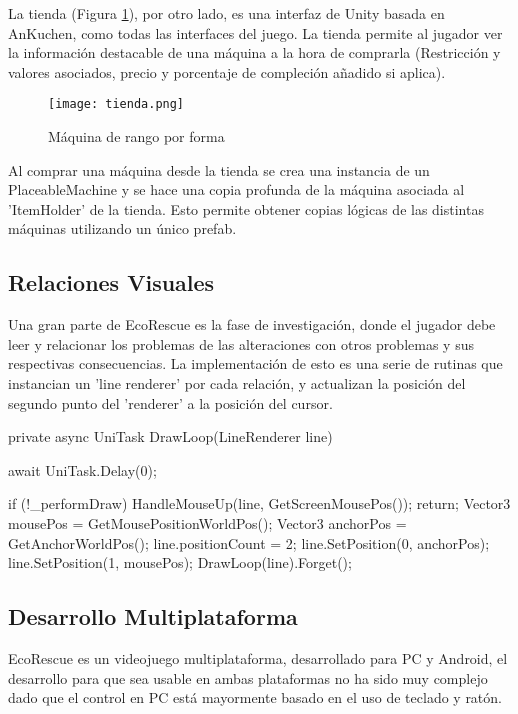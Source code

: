 La tienda (Figura \ref{fig:tienda}), por otro lado, es una interfaz de Unity basada en AnKuchen\cite{AnKuchen}, como todas las interfaces del juego. La tienda permite al jugador ver la información destacable de una máquina a la hora de comprarla (Restricción y valores asociados, precio y porcentaje de compleción añadido si aplica). 

\begin{figure}[H]
\centering
    \texttt{[image: tienda.png]}
\caption{Máquina de rango por forma}
\label{fig:tienda}
\end{figure}

Al comprar una máquina desde la tienda se crea una instancia de un PlaceableMachine y se hace una copia profunda de la máquina asociada al 'ItemHolder' de la tienda. Esto permite obtener copias lógicas de las distintas máquinas utilizando un único prefab.


\subsection{Relaciones Visuales}

Una gran parte de EcoRescue es la fase de investigación, donde el jugador debe leer y relacionar los problemas de las alteraciones con otros problemas y sus respectivas consecuencias. La implementación de esto es una serie de rutinas que instancian un 'line renderer' por cada relación, y actualizan la posición del segundo punto del 'renderer' a la posición del cursor.

\begin{mypython}[caption={Código para dibujar la línea de relaciones.},label={alg:drawloop}]
private async UniTask DrawLoop(LineRenderer line) 
{
    await UniTask.Delay(0);
    
    if (!_performDraw) 
    {
        HandleMouseUp(line, GetScreenMousePos());
        return;
    }
    Vector3 mousePos = GetMousePositionWorldPos();
    Vector3 anchorPos = GetAnchorWorldPos();
    line.positionCount = 2;
    line.SetPosition(0, anchorPos);
    line.SetPosition(1, mousePos);
    DrawLoop(line).Forget();
}
\end{mypython}

\subsection{Desarrollo Multiplataforma}

EcoRescue es un videojuego multiplataforma, desarrollado para PC y Android, el desarrollo para que sea usable en ambas plataformas no ha sido muy complejo dado que el control en PC está mayormente basado en el uso de teclado y ratón.

